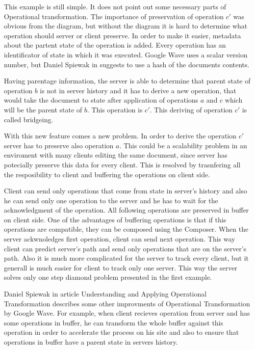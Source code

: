 \documentclass[12pt,oneside]{fithesis2}
\begin{document}
\par This example is still simple. It does not point out some necessary parts of Operational transformation. The importance of preservation of operation \(c'\) was obvious from the diagram, but without the diagram it is hard to determine what operation should server or client preserve. In order to make it easier, metadata about the partent state of the operation is added. Every operation has an identificator of state in which it was executed. Google Wave uses a scalar version number, but Daniel Spiewak in \cite{Spiewak} suggests to use a hash of the documents contents. 
\par Having parentage information, the server is able to determine that parent state of operation \(b\) is not in server history and it has to derive a new operation, that would take the document to state after application of operations \(a\) and \(c\) which will be the parent state of \(b\). This operation is \(c'\). This deriving of operation \(c'\) is called bridgeing.
\par With this new feature comes a new problem. In order to derive the operation \(c'\) server has to preserve also operation \(a\). This could be a scalability problem in an enviroment with many clients editing the same document, since server has potecially preserve this data for every client. This is resolved by trasnfering all the resposibility to client and buffering the operations on client side. 
\par Client can send only operations that come from state in server's history and also he can send only one operation to the server and he has to wait for the acknowledgment of the operation. All following operations are preserved in buffer on client side. One of the advantages of buffering operations is that if this operations are compatible, they can be composed using the Composer. When the server ackwnoledges first operation, client can send next operation. This way client can predict server's path and send only operations that are on the server's path. Also it is much more complicated for the server to track every client, but it generall is much easier for client to track only one server. This way the server solves only one step diamond problem presented in the first example.
\par Daniel Spiewak in article Understanding and Applying Operational Transformation \cite{Spiewak} describes some other improvments of Operational Transformation by Google Wave. For example, when client recieves operation from server and has some operations in buffer, he can transform the whole buffer against this operation in order to accelerate the process on his site and also to ensure that operations in buffer have a parent state in servers history.
\end{document}
